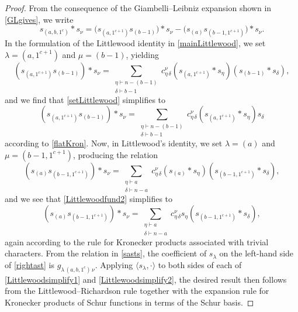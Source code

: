 \documentclass[12pt]{article}
\begin{document}
\begin{proof}
 From the consequence of the Giambelli--Leibniz expansion shown in \eqref{GLgives}, we write 
\begin{equation}\label{rightast}
 s_{(a, b, 1^c)} \ast s_{\nu} = \big( s_{(a, 1^{c+1})} s_{(b-1)} \big) \ast s_{\nu} - \big( s_{(a)} s_{(b-1, 1^{c+1})} \big) \ast s_{\nu}. 
\end{equation}
 In the formulation of the Littlewood identity in \eqref{mainLittlewood}, we set $\lambda = (a, 1^{c+1})$ and $\mu = (b-1)$, yielding 
\begin{equation}\label{setLittlewood}
 \left( s_{(a, 1^{c+1})} s_{(b-1)} \right) \ast s_{\nu} = \sum_{\substack{ \eta \vdash n - (b-1) \\ \delta \vdash b - 1 }} c_{\eta \, \delta}^{\nu} 
 \left( s_{(a, 1^{c+1})} \ast s_{\eta} \right) \left( s_{(b-1)} \ast s_{\delta} \right), 
\end{equation}
 and we find that \eqref{setLittlewood} simplifies to 
\begin{equation}\label{Littlewoodsimplify1}
 \left( s_{(a, 1^{c+1})} s_{(b-1)} \right) \ast s_{\nu} = \sum_{\substack{ \eta \vdash n - (b-1) \\ \delta \vdash b - 1 }} c_{\eta \, \delta}^{\nu} 
 \left( s_{(a, 1^{c+1})} \ast s_{\eta} \right) s_{\delta} 
\end{equation}
 according to \eqref{flatKron}. Now, in Littlewood's identity, we set $\lambda = (a)$ and $\mu = (b-1, 1^{c+1})$, producing the relation 
\begin{equation}\label{Littlewoodfund2}
 \left( s_{(a)} s_{(b-1, 1^{c+1})} \right) \ast s_{\nu} = \sum_{\substack{ \eta \vdash a \\ \delta \vdash n - a }} c_{\eta \, \delta}^{\nu} \left( 
 s_{(a)} \ast s_{\eta} \right) \left( s_{(b-1, 1^{c+1})} \ast s_{\delta} \right), 
\end{equation}
 and we see that \eqref{Littlewoodfund2} simplifies to 
\begin{equation}\label{Littlewoodsimplify2}
 \left( s_{(a)} s_{(b-1, 1^{c+1})} \right) \ast s_{\nu} = \sum_{\substack{ \eta \vdash a \\ \delta \vdash n - a }} c_{\eta \, \delta}^{\nu}
 s_{\eta} \left( s_{(b-1, 1^{c+1})} \ast s_{\delta} \right), 
\end{equation}
 again according to the rule for Kronecker products associated with trivial characters. From the relation in \eqref{sasts}, the coefficient of 
 $s_{\lambda}$ on the left-hand side of \eqref{rightast} is $g_{ \lambda \, (a, b, 1^c) \, \nu }$. Applying $\langle s_{\lambda}, \cdot 
 \rangle$ to both sides of each of \eqref{Littlewoodsimplify1} and \eqref{Littlewoodsimplify2}, the desired result then follows from the 
 Littlewood--Richardson rule together with the expansion rule for Kronecker products of Schur functions in terms of the Schur basis. 
 \end{proof}
\end{document}
